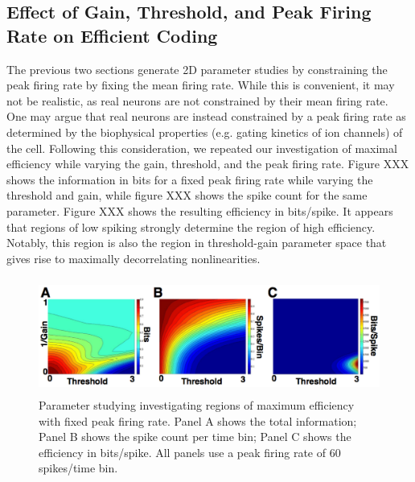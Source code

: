 \documentclass[12pt]{article}
\begin{document}
\subsection{Effect of Gain, Threshold, and Peak Firing Rate on Efficient Coding}

The previous two sections generate 2D parameter studies by constraining the peak firing rate by fixing the mean firing rate. While this is convenient, it may not be realistic, as real neurons are not constrained by their mean firing rate. One may argue that real neurons are instead constrained by a peak firing rate as determined by the biophysical properties (e.g. gating kinetics of ion channels) of the cell. Following this consideration, we repeated our investigation of maximal efficiency while varying the gain, threshold, and the peak firing rate. Figure XXX shows the information in bits for a fixed peak firing rate while varying the threshold and gain, while figure XXX shows the spike count for the same parameter. Figure XXX shows the resulting efficiency in bits/spike. It appears that regions of low spiking strongly determine the region of high efficiency. Notably, this region is also the region in threshold-gain parameter space that gives rise to maximally decorrelating nonlinearities. 

\begin{figure}[h!!]
\centerline{\includegraphics*[height = 1.5in,width=5.0in,angle=0]{Figure4PeakFR.pdf}}
\label{Figure 3}
\caption{Parameter studying investigating regions of maximum efficiency with fixed peak firing rate. Panel A shows the total information; Panel B shows the spike count per time bin; Panel C shows the efficiency in bits/spike. All panels use a peak firing rate of 60 spikes/time bin. }
\end{figure}
\end{document}
